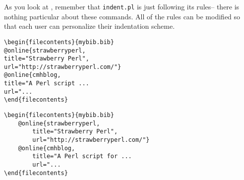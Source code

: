  As you look at , remember
 that \lstinline!indent.pl! is just following its rules-- there is nothing 
 particular about these commands. All of the rules can be modified 
 so that each user can personalize their indentation scheme.
 \begin{adjustwidth}{-2cm}{2cm}
 	\begin{minipage}{.5\textwidth}
 		\begin{lstlisting}[style=demo,caption={\lstinline!filecontents! before},label={lst:filecontentsbefore}]
\begin{filecontents}{mybib.bib}
@online{strawberryperl,
title="Strawberry Perl",
url="http://strawberryperl.com/"}
@online{cmhblog,
title="A Perl script ...
url="...
\end{filecontents}
 		\end{lstlisting}
 	\end{minipage}%
 	\begin{minipage}{.5\textwidth}
 		\begin{lstlisting}[style=demo,caption={\lstinline!filecontents! after}]
\begin{filecontents}{mybib.bib}
	@online{strawberryperl,
		title="Strawberry Perl",
		url="http://strawberryperl.com/"}
	@online{cmhblog,
		title="A Perl script for ...
		url="...
\end{filecontents}
 		\end{lstlisting}
 	\end{minipage}
 	 				

\end{adjustwidth}
